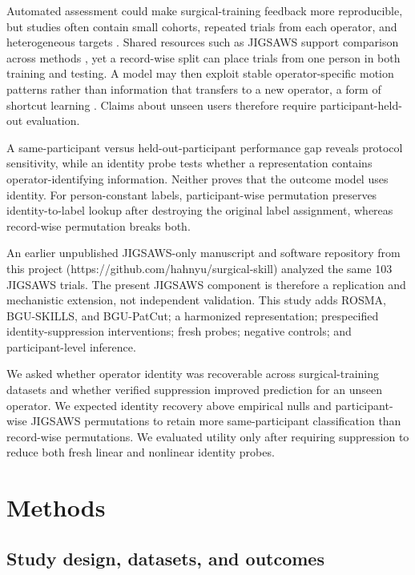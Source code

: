 \documentclass[11pt]{article}
\begin{document}
Automated assessment could make surgical-training feedback more
reproducible, but studies often contain small cohorts, repeated trials
from each operator, and heterogeneous targets \citep{Lam2022}. Shared
resources such as JIGSAWS support comparison across methods
\citep{Ahmidi2017}, yet a record-wise split can place trials from one
person in both training and testing. A model may then exploit stable
operator-specific motion patterns rather than information that transfers
to a new operator, a form of shortcut learning \citep{Geirhos2020}.
Claims about unseen users therefore require participant-held-out
evaluation.

A same-participant versus held-out-participant performance gap reveals
protocol sensitivity, while an identity probe tests whether a
representation contains operator-identifying information. Neither proves
that the outcome model uses identity. For person-constant labels,
participant-wise permutation preserves identity-to-label lookup after
destroying the original label assignment, whereas record-wise
permutation breaks both.

An earlier unpublished JIGSAWS-only manuscript and software repository
from this project (https://github.com/hahnyu/surgical-skill) analyzed
the same 103 JIGSAWS trials. The present JIGSAWS component is therefore
a replication and mechanistic extension, not independent validation.
This study adds ROSMA, BGU-SKILLS, and BGU-PatCut; a harmonized
representation; prespecified identity-suppression interventions; fresh
probes; negative controls; and participant-level inference.

We asked whether operator identity was recoverable across
surgical-training datasets and whether verified suppression improved
prediction for an unseen operator. We expected identity recovery above
empirical nulls and participant-wise JIGSAWS permutations to retain more
same-participant classification than record-wise permutations. We
evaluated utility only after requiring suppression to reduce both fresh
linear and nonlinear identity probes.

\section{Methods}\label{methods}

\subsection{Study design, datasets, and
outcomes}\label{study-design-datasets-and-outcomes}
\end{document}
